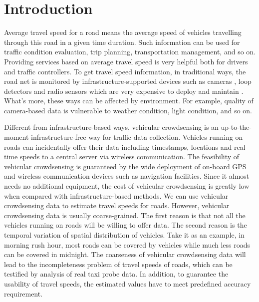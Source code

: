\documentclass[twocolumn,10pt,final,conference]{IEEEtran}
\begin{document}
\section{Introduction}\label{section-Introduction}
Average travel speed for a road means the average speed of vehicles travelling through this road in a given time duration.
Such information can be used for traffic condition evaluation, trip planning, transportation management, and so on.
Providing services based on average travel speed is very helpful both for drivers and traffic controllers.
To get travel speed information, in traditional ways, the road net is monitored by infrastructure-supported devices such as cameras \cite{Ref72,Ref73}, loop detectors \cite{Ref74,Ref75} and radio sensors \cite{Ref71}  which are very expensive to deploy and maintain \cite{Ref79}.
What's more, these ways can be affected by environment. For example, quality of camera-based data is vulnerable to weather condition, light condition, and so on.

Different from infrastructure-based ways, vehicular crowdsensing is an up-to-the-moment infrastructure-free way for traffic data collection.
Vehicles running on roads can incidentally offer their data including timestamps, locations and real-time speeds to a central server via wireless communication.
The feasibility of vehicular crowdsensing is guaranteed by the wide deployment of on-board GPS and wireless communication devices such as navigation facilities. Since it almost needs no additional equipment, the cost of vehicular crowdsensing is greatly low when compared with infrastructure-based methods. We can use vehicular crowdsensing data to estimate travel speeds for roads.
However, vehicular crowdsensing data is usually coarse-grained. The first reason is that not all the vehicles running on roads will be willing to offer data. The second reason is the temporal variation of spatial distribution of vehicles. Take it as an example, in morning rush hour, most roads can be covered by vehicles while much less roads can be covered in midnight. The coarseness of vehicular crowdsensing data will lead to the incompleteness problem of travel speeds of roads,  which can be testified by analysis of real taxi probe data. In addition, to guarantee the usability of travel speeds, the estimated values have to meet predefined accuracy requirement.
\end{document}
